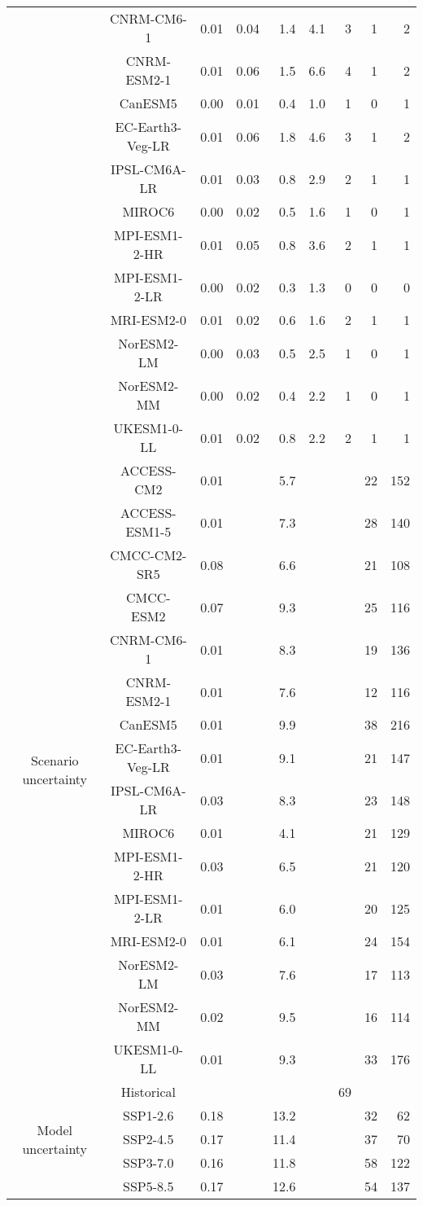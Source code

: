 \begin{table*}[t]
\begin{tabular}{c|c|rr|rr|rrr}
 & CNRM-CM6-1 & 0.01 & 0.04 & 1.4 & 4.1 & 3 & 1 & 2 \\
 & CNRM-ESM2-1 & 0.01 & 0.06 & 1.5 & 6.6 & 4 & 1 & 2 \\
 & CanESM5 & 0.00 & 0.01 & 0.4 & 1.0 & 1 & 0 & 1 \\
 & EC-Earth3-Veg-LR & 0.01 & 0.06 & 1.8 & 4.6 & 3 & 1 & 2 \\
 & IPSL-CM6A-LR & 0.01 & 0.03 & 0.8 & 2.9 & 2 & 1 & 1 \\
 & MIROC6 & 0.00 & 0.02 & 0.5 & 1.6 & 1 & 0 & 1 \\
 & MPI-ESM1-2-HR & 0.01 & 0.05 & 0.8 & 3.6 & 2 & 1 & 1 \\
 & MPI-ESM1-2-LR & 0.00 & 0.02 & 0.3 & 1.3 & 0 & 0 & 0 \\
 & MRI-ESM2-0 & 0.01 & 0.02 & 0.6 & 1.6 & 2 & 1 & 1 \\
 & NorESM2-LM & 0.00 & 0.03 & 0.5 & 2.5 & 1 & 0 & 1 \\
 & NorESM2-MM & 0.00 & 0.02 & 0.4 & 2.2 & 1 & 0 & 1 \\
 & UKESM1-0-LL & 0.01 & 0.02 & 0.8 & 2.2 & 2 & 1 & 1 \\
\cline{1-9}
\multirow[c]{16}{*}{Scenario uncertainty} & ACCESS-CM2 & 0.01 &  & 5.7 &  &  & 22 & 152 \\
 & ACCESS-ESM1-5 & 0.01 &  & 7.3 &  &  & 28 & 140 \\
 & CMCC-CM2-SR5 & 0.08 &  & 6.6 &  &  & 21 & 108 \\
 & CMCC-ESM2 & 0.07 &  & 9.3 &  &  & 25 & 116 \\
 & CNRM-CM6-1 & 0.01 &  & 8.3 &  &  & 19 & 136 \\
 & CNRM-ESM2-1 & 0.01 &  & 7.6 &  &  & 12 & 116 \\
 & CanESM5 & 0.01 &  & 9.9 &  &  & 38 & 216 \\
 & EC-Earth3-Veg-LR & 0.01 &  & 9.1 &  &  & 21 & 147 \\
 & IPSL-CM6A-LR & 0.03 &  & 8.3 &  &  & 23 & 148 \\
 & MIROC6 & 0.01 &  & 4.1 &  &  & 21 & 129 \\
 & MPI-ESM1-2-HR & 0.03 &  & 6.5 &  &  & 21 & 120 \\
 & MPI-ESM1-2-LR & 0.01 &  & 6.0 &  &  & 20 & 125 \\
 & MRI-ESM2-0 & 0.01 &  & 6.1 &  &  & 24 & 154 \\
 & NorESM2-LM & 0.03 &  & 7.6 &  &  & 17 & 113 \\
 & NorESM2-MM & 0.02 &  & 9.5 &  &  & 16 & 114 \\
 & UKESM1-0-LL & 0.01 &  & 9.3 &  &  & 33 & 176 \\
\cline{1-9}
\multirow[c]{5}{*}{Model uncertainty} & Historical &  &  &  &  & 69 &  &  \\
 & SSP1-2.6 & 0.18 &  & 13.2 &  &  & 32 & 62 \\
 & SSP2-4.5 & 0.17 &  & 11.4 &  &  & 37 & 70 \\
 & SSP3-7.0 & 0.16 &  & 11.8 &  &  & 58 & 122 \\
 & SSP5-8.5 & 0.17 &  & 12.6 &  &  & 54 & 137 \\
\cline{1-9}
\bottomrule
\end{tabular}
\end{table*}
